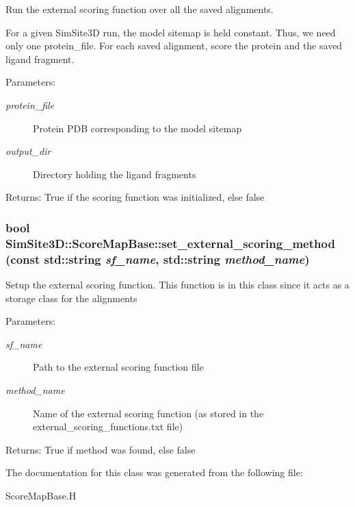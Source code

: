 Run the external scoring function over all the saved alignments. 

For a given SimSite3D run, the model sitemap is held constant. Thus, we need only one protein\_\-file. For each saved alignment, score the protein and the saved ligand fragment.

\begin{Desc}
\item[Parameters:]
\begin{description}
\item[{\em protein\_\-file}]Protein PDB corresponding to the model sitemap \item[{\em output\_\-dir}]Directory holding the ligand fragments \end{description}
\end{Desc}
\begin{Desc}
\item[Returns:]True if the scoring function was initialized, else false \end{Desc}
\subsubsection{\setlength{\rightskip}{0pt plus 5cm}bool SimSite3D::Score\-Map\-Base::set\_\-external\_\-scoring\_\-method (const std::string {\em sf\_\-name}, std::string {\em method\_\-name})\hspace{0.3cm}{\tt  [inline]}}\label{classSimSite3D_1_1ScoreMapBase_d24ec72fca67bdacb134c71a0e78e9d6}


Setup the external scoring function. This function is in this class since it acts as a storage class for the alignments

\begin{Desc}
\item[Parameters:]
\begin{description}
\item[{\em sf\_\-name}]Path to the external scoring function file \item[{\em method\_\-name}]Name of the external scoring function (as stored in the external\_\-scoring\_\-functions.txt file) \end{description}
\end{Desc}
\begin{Desc}
\item[Returns:]True if method was found, else false \end{Desc}


The documentation for this class was generated from the following file:\begin{CompactItemize}
\item 
Score\-Map\-Base.H\end{CompactItemize}
